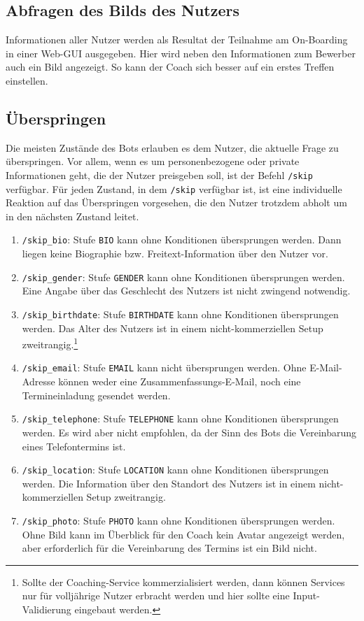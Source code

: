         \subsection{Abfragen des Bilds des Nutzers}
            Informationen aller Nutzer werden als Resultat der Teilnahme am On-Boarding in einer Web-GUI ausgegeben. Hier wird neben den Informationen zum Bewerber auch ein Bild angezeigt. So kann der Coach sich besser auf ein erstes Treffen einstellen. 
        
        \subsection{Überspringen} \label{Realisierung: skip}
            Die meisten Zustände des Bots erlauben es dem Nutzer, die aktuelle Frage zu überspringen. Vor allem, wenn es um personenbezogene oder private Informationen geht, die der Nutzer preisgeben soll, ist der Befehl \verb|/skip| verfügbar. Für jeden Zustand, in dem \verb|/skip| verfügbar ist, ist eine individuelle Reaktion auf das Überspringen vorgesehen, die den Nutzer trotzdem abholt um in den nächsten Zustand leitet. 
            \begin{enumerate}
                \item \verb|/skip_bio|: Stufe \verb|BIO| kann ohne Konditionen übersprungen werden. Dann liegen keine Biographie bzw. Freitext-Information über den Nutzer vor.
                \item \verb|/skip_gender|: Stufe \verb|GENDER| kann ohne Konditionen übersprungen werden. Eine Angabe über das Geschlecht des Nutzers ist nicht zwingend notwendig.
                \item \verb|/skip_birthdate|: Stufe \verb|BIRTHDATE| kann ohne Konditionen übersprungen werden. Das Alter des Nutzers ist in einem nicht-kommerziellen Setup zweitrangig.\footnote{Sollte der Coaching-Service kommerzialisiert werden, dann können Services nur für volljährige Nutzer erbracht werden und hier sollte eine Input-Validierung eingebaut werden.}
                \item \verb|/skip_email|: Stufe \verb|EMAIL| kann nicht übersprungen werden. Ohne E-Mail-Adresse können weder eine Zusammenfassungs-E-Mail, noch eine Termineinladung gesendet werden.
                \item \verb|/skip_telephone|: Stufe \verb|TELEPHONE| kann ohne Konditionen übersprungen werden. Es wird aber nicht empfohlen, da der Sinn des Bots die Vereinbarung eines Telefontermins ist.
                \item \verb|/skip_location|: Stufe \verb|LOCATION| kann ohne Konditionen übersprungen werden. Die Information über den Standort des Nutzers ist in einem nicht-kommerziellen Setup zweitrangig. 
                \item \verb|/skip_photo|: Stufe \verb|PHOTO| kann ohne Konditionen übersprungen werden. Ohne Bild kann im Überblick für den Coach kein Avatar angezeigt werden, aber erforderlich für die Vereinbarung des Termins ist ein Bild nicht.
            \end{enumerate}
            
